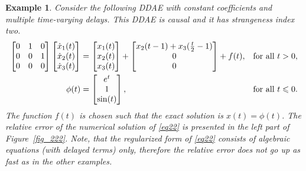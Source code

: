 \documentclass[final,reqno]{siamltex}
\newtheorem{example}[theorem]{Example}
\begin{document}
\begin{example}{\rm
Consider the following DDAE with constant coefficients and multiple time-varying delays. This DDAE is causal and it has
strangeness index two.
%
\begin{equation}\label{eq22}
\begin{aligned}
\m{
0&1&0\\
0&0&1 \\
0&0&0
}
\m{\dot{x}_1(t) \\ \dot{x}_2(t) \\ \dot{x}_3(t)} &=
\m{x_1(t) \\ x_2(t) \\ x_3(t)} +
\m{
x_2(t-1)+x_3(\tfrac t2-1)\\
0\\
0
}
+f(t), && \mbox{for all } t>0,\\
\phi(t) &=
\m{
e^t\\
1\\
\sin(t)
},
&& \mbox{for all } t \leq 0.
\end{aligned}
\end{equation}
%
The function $f(t)$ is chosen such that the exact solution is $x(t)=\phi(t)$. The relative error of the numerical solution of \eqref{eq22} is presented in the left part of Figure~\ref{fig_222}.  Note, that the regularized form of \eqref{eq22} consists of algebraic equations (with delayed terms) only, therefore the relative error does not go up as fast as in the other examples.
}
\end{example}
\end{document}
